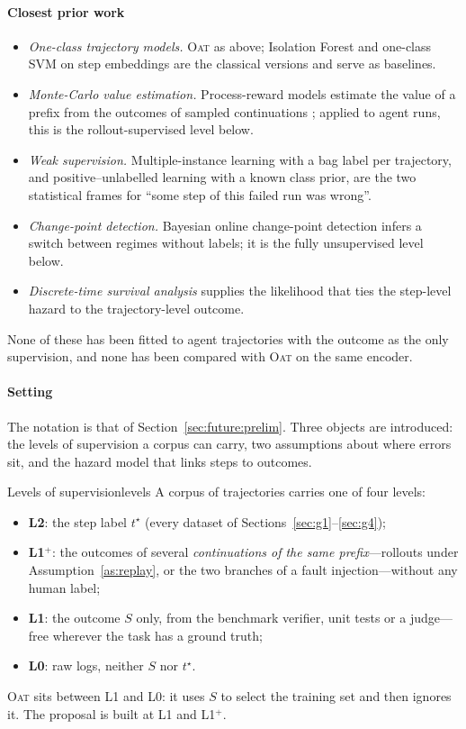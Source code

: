 \documentclass[10pt,a4paper]{article}
\begin{document}
\paragraph{Closest prior work}
\begin{itemize}[leftmargin=1.1em]
\item \emph{One-class trajectory models.} \textsc{Oat} \cite{yeh2026oat} as above; Isolation Forest and one-class SVM on step embeddings are the classical versions and serve as baselines.
\item \emph{Monte-Carlo value estimation.} Process-reward models estimate the value of a prefix from the outcomes of sampled continuations \cite{wang2024mathshepherd}; applied to agent runs, this is the rollout-supervised level below.
\item \emph{Weak supervision.} Multiple-instance learning \cite{dietterich1997mil} with a bag label per trajectory, and positive--unlabelled learning \cite{elkan2008pu,kiryo2017nnpu} with a known class prior, are the two statistical frames for ``some step of this failed run was wrong''.
\item \emph{Change-point detection.} Bayesian online change-point detection \cite{adams2007bocpd} infers a switch between regimes without labels; it is the fully unsupervised level below.
\item \emph{Discrete-time survival analysis} supplies the likelihood that ties the step-level hazard to the trajectory-level outcome.
\end{itemize}
None of these has been fitted to agent trajectories with the outcome as the only supervision, and none has been compared with \textsc{Oat} on the same encoder.

\paragraph{Setting} The notation is that of Section~\ref{sec:future:prelim}. Three objects are introduced: the levels of supervision a corpus can carry, two assumptions about where errors sit, and the hazard model that links steps to outcomes.

\begin{definition}{Levels of supervision}{levels}
A corpus of trajectories carries one of four levels:
\begin{itemize}[leftmargin=1.1em]
\item \textbf{L2}: the step label $t^\star$ (every dataset of Sections~\ref{sec:g1}--\ref{sec:g4});
\item \textbf{L1$^{+}$}: the outcomes of several \emph{continuations of the same prefix}---rollouts under Assumption~\ref{as:replay}, or the two branches of a fault injection---without any human label;
\item \textbf{L1}: the outcome $S$ only, from the benchmark verifier, unit tests or a judge---free wherever the task has a ground truth;
\item \textbf{L0}: raw logs, neither $S$ nor $t^\star$.
\end{itemize}
\textsc{Oat} sits between L1 and L0: it uses $S$ to select the training set and then ignores it. The proposal is built at L1 and L1$^{+}$.
\end{definition}
\end{document}
